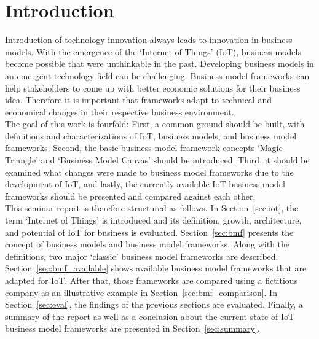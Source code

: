 \section{Introduction}
\vspace{-1em}
	Introduction of technology innovation always leads to innovation in business models. With the emergence of the `Internet of Things' (IoT), business models become possible that were unthinkable in the past. Developing business models in an emergent technology field can be challenging. Business model frameworks can help stakeholders to come up with better economic solutions for their business idea. Therefore it is important that frameworks adapt to technical and economical changes in their respective business environment.\\
	The goal of this work is fourfold: First, a common ground should be built, with definitions and characterizations of IoT, business models, and business model frameworks. Second, the basic business model framework concepts `Magic Triangle' and `Business Model Canvas' should be introduced. Third, it should be examined what changes were made to business model frameworks due to the development of IoT, and lastly, the currently available IoT business model frameworks should be presented and compared against each other.\\
	This seminar report is therefore structured as follows. In Section~\ref{sec:iot}, the term `Internet of Things' is introduced and its definition, growth, architecture, and potential of IoT for business is evaluated. Section~\ref{sec:bmf} presents the concept of business models and business model frameworks. Along with the definitions, two major `classic' business model frameworks are described. Section~\ref{sec:bmf_available} shows available business model frameworks that are adapted for IoT. After that, those frameworks are compared using a fictitious company as an illustrative example in Section~\ref{sec:bmf_comparison}. In Section~\ref{sec:eval}, the findings of the previous sections are evaluated. Finally, a summary of the report as well as a conclusion about the current state of IoT business model frameworks are presented in Section~\ref{sec:summary}.
\vspace{-1em}
